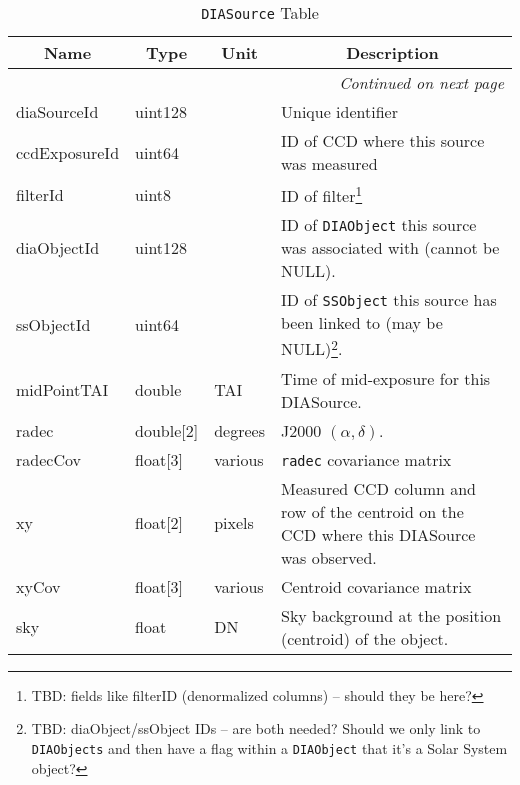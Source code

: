 \documentclass[12pt]{article}
\newcommand{\code}[1]{\texttt{#1}}
\newcommand{\DIASource}{\code{DIASource}\xspace}
\newcommand{\DIAObject}{\code{DIAObject}\xspace}
\newcommand{\DIAObjects}{\code{DIAObjects}\xspace}
\newcommand{\SSObject}{\code{SSObject}\xspace}
\begin{document}
\begin{center}
\begin{longtable}{p{3cm}p{2cm}p{2cm}p{5cm}}
\caption[\DIASource Table]{\DIASource Table} \\

\hline \multicolumn{1}{c}{\bf Name} & \multicolumn{1}{c}{\bf Type} & \multicolumn{1}{c}{\bf Unit} & \multicolumn{1}{c}{\bf Description} \\ \hline
\endhead

\hline \multicolumn{4}{r}{{\em Continued on next page}} \\
\endfoot

\hline\hline
\endlastfoot

diaSourceId & uint128 & ~ & Unique identifier \\ 

ccdExposureId & uint64 & ~ & ID of CCD where this source was measured \\ 

filterId & uint8 & ~ & ID of filter\footnote{TBD: fields like filterID (denormalized columns) -- should they be here?}\\ 

diaObjectId & uint128 & ~ & ID of \DIAObject this source was associated with (cannot be NULL). \\ 

ssObjectId & uint64 & ~ & ID of \SSObject this source has been linked to (may be NULL)\footnote{TBD: diaObject/ssObject IDs -- are both needed? Should we only link to \DIAObjects and then have a flag within a \DIAObject that it's a Solar System object?}. \\ 

midPointTAI & double & TAI & Time of mid-exposure for this DIASource. \\ 

radec & double[2] & degrees & J2000 $(\alpha, \delta)$. \\ 

radecCov & float[3] & various & \texttt{radec} covariance matrix \\ 

xy & float[2] & pixels & Measured CCD column and row of the centroid on the CCD where this DIASource was observed. \\ 

xyCov & float[3] & various & Centroid covariance matrix \\ 

sky & float & DN & Sky background at the position (centroid) of the object. \\ 


\end{longtable}
\end{center}
\end{document}
